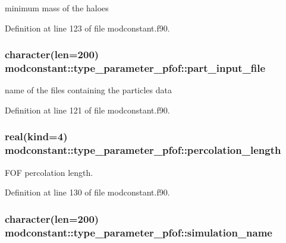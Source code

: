 minimum mass of the haloes 



Definition at line 123 of file modconstant.\-f90.

\hypertarget{structmodconstant_1_1type__parameter__pfof_ac6d921f4e7cea83883c15e106de98adf}{
\subsubsection[{part\-\_\-input\-\_\-file}]{\setlength{\rightskip}{0pt plus 5cm}character(len=200) modconstant\-::type\-\_\-parameter\-\_\-pfof\-::part\-\_\-input\-\_\-file}}\label{structmodconstant_1_1type__parameter__pfof_ac6d921f4e7cea83883c15e106de98adf}


name of the files containing the particles data 



Definition at line 121 of file modconstant.\-f90.

\hypertarget{structmodconstant_1_1type__parameter__pfof_aa62ddf1e2fd4d2d5d5f6fb9381268784}{
\subsubsection[{percolation\-\_\-length}]{\setlength{\rightskip}{0pt plus 5cm}real(kind=4) modconstant\-::type\-\_\-parameter\-\_\-pfof\-::percolation\-\_\-length}}\label{structmodconstant_1_1type__parameter__pfof_aa62ddf1e2fd4d2d5d5f6fb9381268784}


F\-O\-F percolation length. 



Definition at line 130 of file modconstant.\-f90.

\hypertarget{structmodconstant_1_1type__parameter__pfof_a47ac45f599246d74572f1e8ca85803c0}{
\subsubsection[{simulation\-\_\-name}]{\setlength{\rightskip}{0pt plus 5cm}character(len=200) modconstant\-::type\-\_\-parameter\-\_\-pfof\-::simulation\-\_\-name}}\label{structmodconstant_1_1type__parameter__pfof_a47ac45f599246d74572f1e8ca85803c0}


